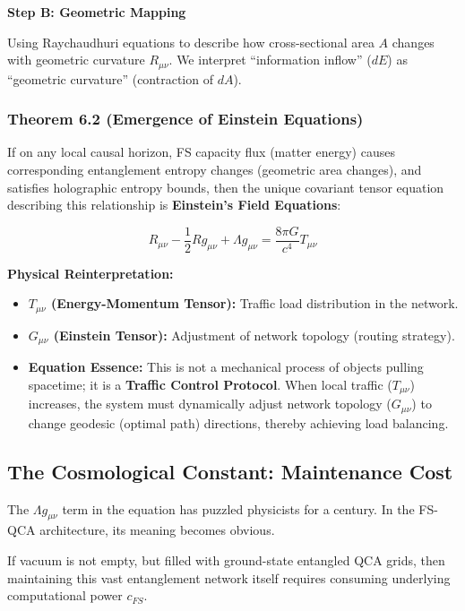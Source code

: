 \textbf{Step B: Geometric Mapping}

Using Raychaudhuri equations to describe how cross-sectional area $A$ changes with geometric curvature $R_{\mu\nu}$. We interpret ``information inflow'' ($dE$) as ``geometric curvature'' (contraction of $dA$).

\subsubsection{Theorem 6.2 (Emergence of Einstein Equations)}

If on any local causal horizon, FS capacity flux (matter energy) causes corresponding entanglement entropy changes (geometric area changes), and satisfies holographic entropy bounds, then the unique covariant tensor equation describing this relationship is \textbf{Einstein's Field Equations}:

$$R_{\mu\nu} - \frac{1}{2}Rg_{\mu\nu} + \Lambda g_{\mu\nu} = \frac{8\pi G}{c^4} T_{\mu\nu}$$

\textbf{Physical Reinterpretation:}

\begin{itemize}
\item \textbf{$T_{\mu\nu}$ (Energy-Momentum Tensor):} Traffic load distribution in the network.

\item \textbf{$G_{\mu\nu}$ (Einstein Tensor):} Adjustment of network topology (routing strategy).

\item \textbf{Equation Essence:} This is not a mechanical process of objects pulling spacetime; it is a \textbf{Traffic Control Protocol}. When local traffic ($T_{\mu\nu}$) increases, the system must dynamically adjust network topology ($G_{\mu\nu}$) to change geodesic (optimal path) directions, thereby achieving load balancing.
\end{itemize}

\subsection{The Cosmological Constant: Maintenance Cost}

The $\Lambda g_{\mu\nu}$ term in the equation has puzzled physicists for a century. In the FS-QCA architecture, its meaning becomes obvious.

If vacuum is not empty, but filled with ground-state entangled QCA grids, then maintaining this vast entanglement network itself requires consuming underlying computational power $c_{FS}$.

